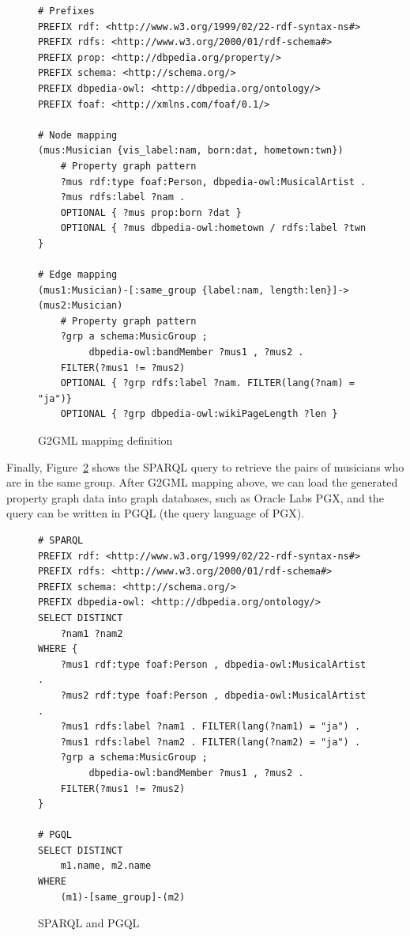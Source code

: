 \documentclass[runningheads]{llncs}
\begin{document}
\begin{figure}[!t]
\vspace{2mm}
\begin{small}
\begin{verbatim}
# Prefixes
PREFIX rdf: <http://www.w3.org/1999/02/22-rdf-syntax-ns#>
PREFIX rdfs: <http://www.w3.org/2000/01/rdf-schema#>
PREFIX prop: <http://dbpedia.org/property/>
PREFIX schema: <http://schema.org/>
PREFIX dbpedia-owl: <http://dbpedia.org/ontology/>
PREFIX foaf: <http://xmlns.com/foaf/0.1/>

# Node mapping
(mus:Musician {vis_label:nam, born:dat, hometown:twn})
    # Property graph pattern
    ?mus rdf:type foaf:Person, dbpedia-owl:MusicalArtist .
    ?mus rdfs:label ?nam .
    OPTIONAL { ?mus prop:born ?dat }
    OPTIONAL { ?mus dbpedia-owl:hometown / rdfs:label ?twn }

# Edge mapping
(mus1:Musician)-[:same_group {label:nam, length:len}]->(mus2:Musician)
    # Property graph pattern
    ?grp a schema:MusicGroup ;
         dbpedia-owl:bandMember ?mus1 , ?mus2 .
    FILTER(?mus1 != ?mus2)
    OPTIONAL { ?grp rdfs:label ?nam. FILTER(lang(?nam) = "ja")}
    OPTIONAL { ?grp dbpedia-owl:wikiPageLength ?len }
\end{verbatim}
\end{small}
\caption{G2GML mapping definition}
\label{fig:g2gml}
\end{figure}

Finally, Figure~\ref{fig:sparql} shows the SPARQL query to retrieve the pairs of musicians who are in the same group. After G2GML mapping above, we can load the generated property graph data into graph databases, such as Oracle Labs PGX, and the query can be written in PGQL (the query language of PGX).

\begin{figure}[!t]
\vspace{2mm}
\begin{small}
\begin{verbatim}
# SPARQL
PREFIX rdf: <http://www.w3.org/1999/02/22-rdf-syntax-ns#>
PREFIX rdfs: <http://www.w3.org/2000/01/rdf-schema#>
PREFIX schema: <http://schema.org/>
PREFIX dbpedia-owl: <http://dbpedia.org/ontology/>
SELECT DISTINCT
    ?nam1 ?nam2
WHERE {
    ?mus1 rdf:type foaf:Person , dbpedia-owl:MusicalArtist .
    ?mus2 rdf:type foaf:Person , dbpedia-owl:MusicalArtist .
    ?mus1 rdfs:label ?nam1 . FILTER(lang(?nam1) = "ja") .
    ?mus1 rdfs:label ?nam2 . FILTER(lang(?nam2) = "ja") .
    ?grp a schema:MusicGroup ;
         dbpedia-owl:bandMember ?mus1 , ?mus2 .
    FILTER(?mus1 != ?mus2)
}

# PGQL
SELECT DISTINCT
    m1.name, m2.name
WHERE
    (m1)-[same_group]-(m2)
\end{verbatim}
\end{small}
\caption{SPARQL and PGQL}
\label{fig:sparql}
\end{figure}
\end{document}
